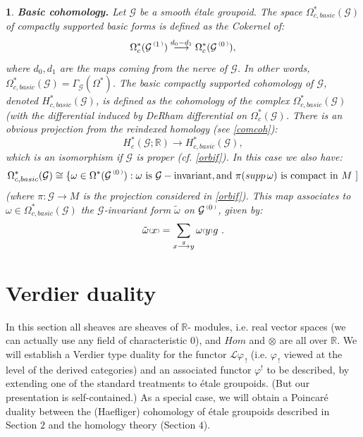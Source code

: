 \documentclass[a4paper]{article}
\newtheorem{num}[st]{}
\newcommand{\f}{\ensuremath{\varphi}}
\newcommand{\rmap}{\longrightarrow}
\newcommand{\G}{\ensuremath{\mathcal{G}}}
\newcommand{\el}{\ensuremath{\mathcal{L}}}
\newcommand{\ps}{{\raise 1pt\hbox{\tiny (}}}
\newcommand{\pd}{{\raise 1pt\hbox{\tiny )}}}
\newcommand{\nG}[1]{\ensuremath{\G^{\,\ps #1\,\pd}}}
\begin{document}
\begin{num}
\emph{
{\bf Basic cohomology.} Let $\G$ be a smooth \'etale groupoid. The space $\Omega^*_{c, basic}(\G)$ of compactly supported basic forms is defined as the Cokernel of:
\[ \Omega^*_c(\nG{1}) \stackrel{d_0-d_1}{\rmap} \Omega^*_c(\nG{0}), \]
where $d_0, d_1$ are the maps coming from the nerve of $\G$. In other words, $\Omega^*_{c, basic}(\G)= \Gamma_{\G}(\Omega^*)$. The {\it basic compactly supported cohomology} of $\G$, denoted $H_{c, basic}^*(\G)$, is defined as the cohomology of the complex $\Omega^*_{c, basic}(\G)$ (with the differential induced by DeRham differential on $\Omega_c^*(\G)$. There is an obvious projection from the reindexed homology (see \ref{comcoh}):
\[ H_c^*(\G; \mathbb{R}) \rmap H_{c, basic}^*(\G), \]
which is an isomorphism if $\G$ is proper (cf. \ref{orbif}). In this case we also have:
\[ \Omega_{c, basic}^*(\G) \cong \{ \omega\in\Omega^*(\nG{0}): \omega \ {\rm is}\ \G-{\rm invariant},{\rm and} \ \pi(supp \, \omega) \ {\rm is\ compact\ in}\ M \ ]\]
(where $\pi: \G\rmap M$ is the projection considered in \ref{orbif}). This map associates to $\omega\in \Omega^*_{c, basic}(\G)$ the $\G$-invariant form $\tilde{\omega}$ on $\nG{0}$, given by:
\[ \tilde{\omega}\ps x\pd = \sum_{x \stackrel{g}{\rmap} y} \omega\ps y\pd g\ .\]
}
\end{num}



\section{Verdier duality}






\hspace*{.3in} In this section all sheaves are sheaves of $\mathbb{R}$- modules, i.e. real vector spaces (we can actually use any field of characteristic $0$), and $Hom$ and $\otimes$ are all over $\mathbb{R}$. We will establish a Verdier type duality for the functor $\el \f_{\, !}$ (i.e. $\f_{\, !}$ viewed at the level of the derived categories) and an associated functor $\f^{!}$ to be described, by extending one of the standard treatments \cite{Iv} to \'etale groupoids. (But our presentation is self-contained.) As a special case, we will obtain a Poincar\'e duality between the (Haefliger) cohomology of \'etale groupoids described in Section $2$ and the homology theory (Section $4$).
\end{document}
